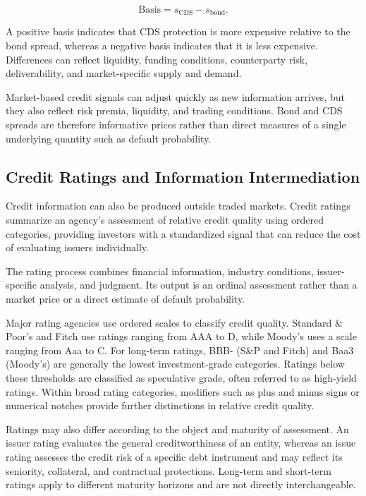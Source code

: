 \begin{equation}
\text{Basis}
=
s_{\mathrm{CDS}}-s_{\mathrm{bond}}.
\label{eq:ch19-cds-bond-basis}
\end{equation}

A positive basis indicates that CDS protection is more expensive relative to the bond spread, whereas a negative basis indicates that it is less expensive. Differences can reflect liquidity, funding conditions, counterparty risk, deliverability, and market-specific supply and demand.

Market-based credit signals can adjust quickly as new information arrives, but they also reflect risk premia, liquidity, and trading conditions. Bond and CDS spreads are therefore informative prices rather than direct measures of a single underlying quantity such as default probability.


\subsection[Credit Ratings and Information Intermediation]{Credit Ratings and Information Intermediation}

Credit information can also be produced outside traded markets. Credit ratings summarize an agency's assessment of relative credit quality using ordered categories, providing investors with a standardized signal that can reduce the cost of evaluating issuers individually.

The rating process combines financial information, industry conditions, issuer-specific analysis, and judgment. Its output is an ordinal assessment rather than a market price or a direct estimate of default probability.

Major rating agencies use ordered scales to classify credit quality. Standard \& Poor's and Fitch use ratings ranging from AAA to D, while Moody's uses a scale ranging from Aaa to C. For long-term ratings, BBB- (S\&P and Fitch) and Baa3 (Moody's) are generally the lowest investment-grade categories. Ratings below these thresholds are classified as speculative grade, often referred to as high-yield ratings. Within broad rating categories, modifiers such as plus and minus signs or numerical notches provide further distinctions in relative credit quality.

Ratings may also differ according to the object and maturity of assessment. An issuer rating evaluates the general creditworthiness of an entity, whereas an issue rating assesses the credit risk of a specific debt instrument and may reflect its seniority, collateral, and contractual protections. Long-term and short-term ratings apply to different maturity horizons and are not directly interchangeable.

